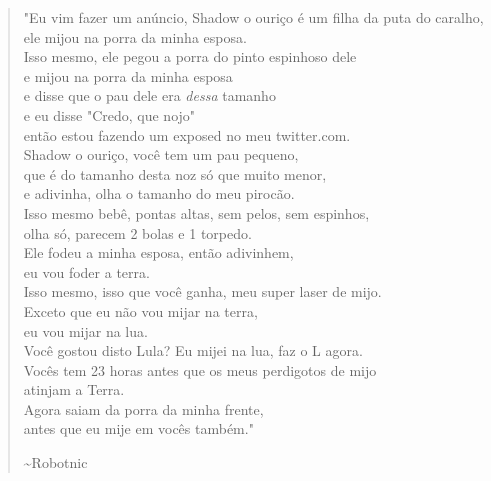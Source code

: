 \newpage
\vfill %

\begin{center}
\selectfont %
\large %

\begin{verse}
    "Eu vim fazer um anúncio, Shadow o ouriço é um filha da puta do caralho,\\
    ele mijou na porra da minha esposa. \\[1em]

    Isso mesmo, ele pegou a porra do pinto espinhoso dele\\
    e mijou na porra da minha esposa\\
    e disse que o pau dele era \textit{dessa} tamanho\\
    e eu disse "Credo, que nojo"\\
    então estou fazendo um exposed no meu twitter.com. \\[1em]

    Shadow o ouriço, você tem um pau pequeno,\\
    que é do tamanho desta noz só que muito menor,\\
    e adivinha, olha o tamanho do meu pirocão. \\[1em]

    Isso mesmo bebê, pontas altas, sem pelos, sem espinhos,\\
    olha só, parecem 2 bolas e 1 torpedo. \\[1em]

    Ele fodeu a minha esposa, então adivinhem,\\
    eu vou foder a terra.\\
    Isso mesmo, isso que você ganha, meu super laser de mijo. \\[1em]

    Exceto que eu não vou mijar na terra,\\
    eu vou mijar na lua. \\[1em]

    Você gostou disto Lula? Eu mijei na lua, faz o L agora.\\
    Vocês tem 23 horas antes que os meus perdigotos de mijo\\
    atinjam a Terra. \\[1em]

    Agora saiam da porra da minha frente,\\
    antes que eu mije em vocês também."

    \hfill \textasciitilde Robotnic %
\end{verse}
\end{center}

\vfill %

